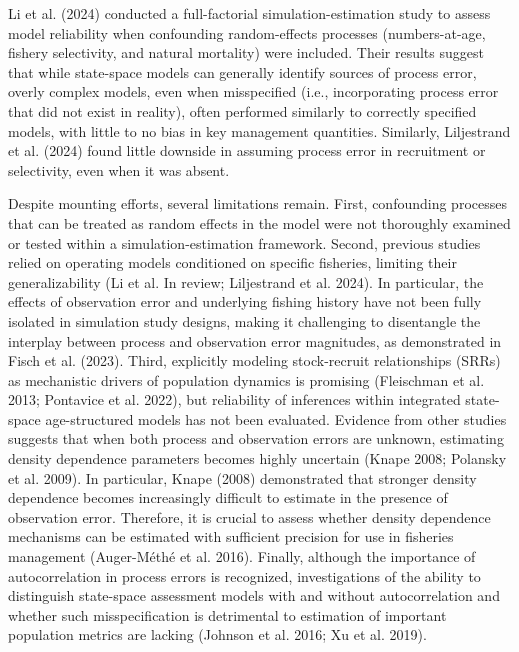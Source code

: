 \documentclass[
  12pt,
]{article}
\begin{document}
Li et al. (2024) conducted a full-factorial simulation-estimation study
to assess model reliability when confounding random-effects processes
(numbers-at-age, fishery selectivity, and natural mortality) were
included. Their results suggest that while state-space models can
generally identify sources of process error, overly complex models, even
when misspecified (i.e., incorporating process error that did not exist
in reality), often performed similarly to correctly specified models,
with little to no bias in key management quantities. Similarly,
Liljestrand et al. (2024) found little downside in assuming process
error in recruitment or selectivity, even when it was absent.

Despite mounting efforts, several limitations remain. First, confounding
processes that can be treated as random effects in the model were not
thoroughly examined or tested within a simulation-estimation framework.
Second, previous studies relied on operating models conditioned on
specific fisheries, limiting their generalizability (Li et al. In
review; Liljestrand et al. 2024). In particular, the effects of
observation error and underlying fishing history have not been fully
isolated in simulation study designs, making it challenging to
disentangle the interplay between process and observation error
magnitudes, as demonstrated in Fisch et al. (2023). Third, explicitly
modeling stock-recruit relationships (SRRs) as mechanistic drivers of
population dynamics is promising (Fleischman et al. 2013; Pontavice et
al. 2022), but reliability of inferences within integrated state-space
age-structured models has not been evaluated. Evidence from other
studies suggests that when both process and observation errors are
unknown, estimating density dependence parameters becomes highly
uncertain (Knape 2008; Polansky et al. 2009). In particular, Knape
(2008) demonstrated that stronger density dependence becomes
increasingly difficult to estimate in the presence of observation error.
Therefore, it is crucial to assess whether density dependence mechanisms
can be estimated with sufficient precision for use in fisheries
management (Auger-Méthé et al. 2016). Finally, although the importance
of autocorrelation in process errors is recognized, investigations of
the ability to distinguish state-space assessment models with and
without autocorrelation and whether such misspecification is detrimental
to estimation of important population metrics are lacking (Johnson et
al. 2016; Xu et al. 2019).
\end{document}
